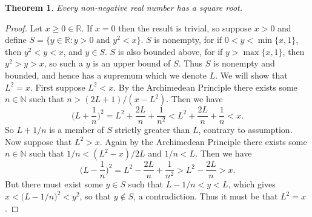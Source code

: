 \documentclass[12pt]{article}
\theoremstyle{plain}
\newtheorem*{thm}{Theorem}
\begin{document}
\begin{thm}
Every non-negative real number has a square root. 
\end{thm}
\begin{proof}
Let $x\geq 0\in\mathbb{R}$. If $x=0$ then the result is trivial, so suppose $x>0$ and define $S=\{y\in\mathbb{R}:y> 0\text{ and }y^2<x\}$. $S$ is nonempty, for if $0<y<\min\{x,1\}$, then $y^2< y<x$, and $y\in S$. $S$ is also bounded above, for if $y>\max\{x,1\}$, then $y^2>y>x$, so such a $y$ is an upper bound of $S$. Thus $S$ is nonempty and bounded, and hence has a supremum which we denote $L$. We will show that $L^2=x$. First suppose $L^2<x$. By the Archimedean Principle there exists some $n\in\mathbb{N}$ such that $n>(2L+1)/(x-L^2)$. Then we have
\begin{equation}
\bigg(L+\dfrac{1}{n}\bigg)^2=L^2+\dfrac{2L}{n}+\dfrac{1}{n^2}
<L^2+\dfrac{2L}{n}+\dfrac{1}{n}<x\text{.}
\end{equation}
So $L+1/n$ is a member of $S$ strictly greater than $L$, contrary to assumption. Now suppose that $L^2>x$. Again by the Archimedean Principle there exists some $n\in\mathbb{N}$ such that $1/n<(L^2-x)/2L$ and $1/n<L$. Then we have
\begin{equation}
\bigg(L-\dfrac{1}{n}\bigg)^2=L^2-\dfrac{2L}{n}+\dfrac{1}{n^2}
>L^2-\dfrac{2L}{n}>x\text{.}
\end{equation}
But there must exist some $y\in S$ such that $L-1/n<y<L$, which gives $x<\big(L-1/n\big)^2<y^2$, so that $y\notin S$, a contradiction. Thus it must be that $L^2=x$. 
\end{proof}

\end{document}
